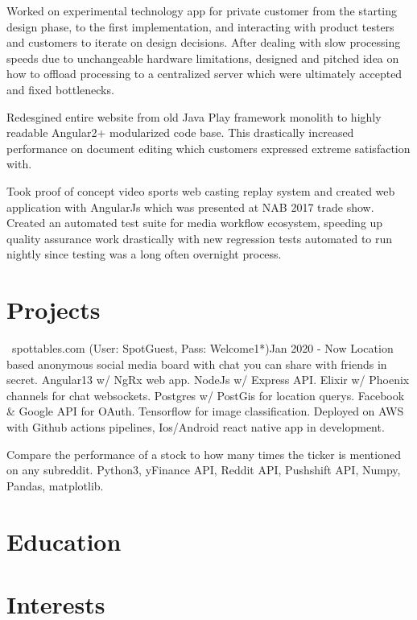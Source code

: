 \documentclass{my_resume}
\begin{document}
\workitemstwo
{Worked on experimental technology app for private customer from the starting design phase, to the first implementation, and interacting
with product testers and customers to iterate on design decisions.}
{After dealing with slow processing speeds due to unchangeable hardware limitations, designed and pitched idea on how to offload
processing to a centralized server which were ultimately accepted and fixed bottlenecks.}

\workitemsone
{Redesgined entire website from old Java Play framework monolith to highly readable Angular2+ modularized code base. This drastically increased performance
 on document editing which customers expressed extreme satisfaction with.}

\workitemstwo
{Took proof of concept video sports web casting replay system and created web application with AngularJs
 which was presented at NAB 2017 trade show.}
{Created an automated test suite for media workflow ecosystem, speeding up quality assurance work drastically with new regression tests
 automated to run nightly since testing was a long often overnight process.}

 \section{Projects}

{\faChrome~spottables.com (User: SpotGuest, Pass: Welcome1*)}{Jan 2020 - Now}
\projectitem
{Location based anonymous social media board with chat you can share with friends in secret.}
{Angular13 w/ NgRx web app. NodeJs w/ Express API. Elixir w/ Phoenix channels for chat websockets. Postgres w/ PostGis for location querys. Facebook \& Google API for OAuth. Tensorflow for image classification. Deployed on AWS with Github actions pipelines, Ios/Android react native app in development.}

\projectitem
{Compare the performance of a stock to how many times the ticker is mentioned on any subreddit.}
{Python3, yFinance API, Reddit API, Pushshift API, Numpy, Pandas, matplotlib.}

\section{Education}

\section{Interests}
\end{document}
